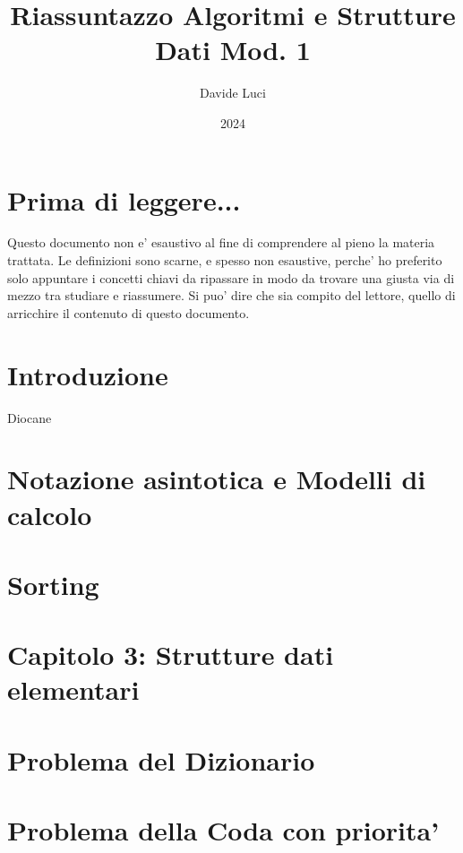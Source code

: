 \documentclass{article}
\title{Riassuntazzo Algoritmi e Strutture Dati Mod. 1}
\author{Davide Luci}
\date{2024}
\begin{document}
    \maketitle
    \tableofcontents
    \newpage


    \setlength{\parindent}{0pt}
    \section{ Prima di leggere...}
    Questo documento non e' esaustivo al fine di comprendere al pieno la materia trattata.
    Le definizioni sono scarne, e spesso non esaustive, perche' ho preferito solo appuntare i concetti chiavi
    da ripassare in modo da trovare una giusta via di mezzo tra studiare e riassumere. Si puo' dire che sia compito del 
    lettore, quello di arricchire il contenuto di questo documento.

    \newpage

    \section*{ Introduzione}
    Diocane

    \newpage
    \section{ Notazione asintotica e Modelli di calcolo}

    \newpage
    \section{ Sorting }

    \newpage
    \section{ Capitolo 3: Strutture dati elementari }
        
        \newpage
    \section {Problema del Dizionario}
        
        \newpage
    \section {Problema della Coda con priorita'}
        
    
\end{document}

